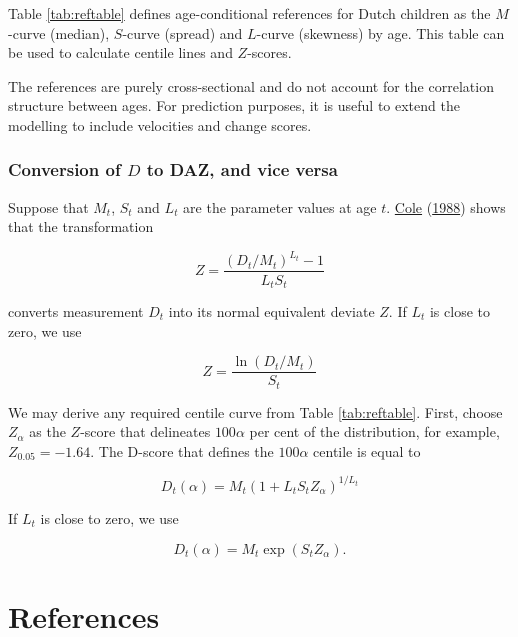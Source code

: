 \documentclass[
]{book}
\begin{document}
Table \ref{tab:reftable} defines age-conditional references for Dutch children as the \(M\)-curve (median), \(S\)-curve (spread) and \(L\)-curve (skewness) by age. This table can be used to calculate centile lines and \(Z\)-scores.

The references are purely cross-sectional and do not account for the correlation structure between ages. For prediction purposes, it is useful to extend the modelling to include velocities and change scores.

\hypertarget{conversion-of-d-to-daz-and-vice-versa}{%
\subsection{\texorpdfstring{Conversion of \(D\) to DAZ, and vice versa}{Conversion of D to DAZ, and vice versa}}\label{conversion-of-d-to-daz-and-vice-versa}}

Suppose that \(M_t\), \(S_t\) and \(L_t\) are the parameter values at age \(t\). \protect\hyperlink{ref-cole1988}{Cole} (\protect\hyperlink{ref-cole1988}{1988}) shows that the transformation

\[Z=\frac{(D_t/M_t)^{L_t}-1}{L_t S_t}\]

converts measurement \(D_t\) into its normal equivalent deviate \(Z\). If \(L_t\) is close to zero, we use

\[Z=\frac{\ln(D_t/M_t)}{S_t}\]

We may derive any required centile curve from Table \ref{tab:reftable}. First, choose \(Z_\alpha\) as the \(Z\)-score that delineates \(100\alpha\) per cent of the distribution, for example, ~\(Z_{0.05}=-1.64\). The D-score that defines the \(100\alpha\) centile is equal to

\[D_t(\alpha) = M_t (1+L_t S_t Z_\alpha)^{1/L_t}\]

If \(L_t\) is close to zero, we use

\[D_t(\alpha)= M_t \exp(S_t Z_\alpha).\]

\hypertarget{references}{%
\chapter*{References}\label{references}}
\end{document}
